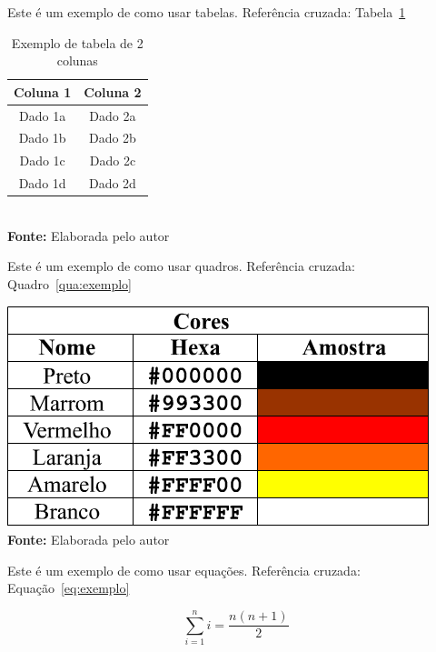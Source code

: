 \documentclass[
	article,
	11pt,
	oneside,
	a4paper,
	chapter=TITLE,
	section=TITLE,
	english,
	brazil,
	sumario=tradicional
]{abntex2}
\begin{document}
     
     Este é um exemplo de como usar tabelas. Referência cruzada: Tabela~\ref{tab:exemplo}
     
     \FloatBarrier
     \begin{table}[!htbp]
     	\centering
     	\caption{Exemplo de tabela de 2 colunas}
     	\begin{tabular}{ c | c }
     		\hline
     		\textbf{Coluna 1} & \textbf{Coluna 2} \\ \hline
     		Dado 1a           & Dado 2a           \\ \hline
     		Dado 1b           & Dado 2b           \\ \hline
     		Dado 1c           & Dado 2c           \\ \hline
     		Dado 1d           & Dado 2d           \\ \hline
     	\end{tabular}
     	\\ \vspace{0.2cm}
     	\textbf{Fonte:} Elaborada pelo autor
     	\label{tab:exemplo}
     \end{table}
     \FloatBarrier
     
     
     Este é um exemplo de como usar quadros. Referência cruzada: Quadro~\ref{qua:exemplo}
     
     \FloatBarrier
     \begin{quadro}[!htbp]
     	\centering
     	\caption{Exemplo de quadro}
     	\includegraphics[scale=.7]{imagens/exemploQuadro}
     	\\\textbf{Fonte:} Elaborada pelo autor
     	\label{qua:exemplo}
     \end{quadro}
     \FloatBarrier
     
     
     Este é um exemplo de como usar equações. Referência cruzada: Equação~\ref{eq:exemplo}
     
     \begin{equation}
     \sum_{i=1}^{n} i = \frac{n(n+1)}{2}
     \label{eq:exemplo}
     \end{equation}
     
\end{document}
